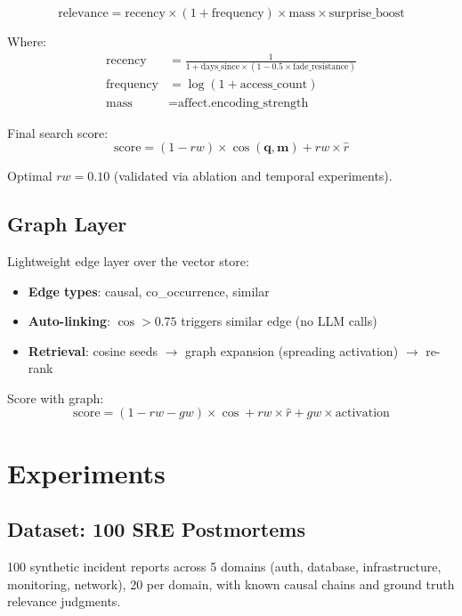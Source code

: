 \documentclass[11pt]{article}
\begin{document}
\begin{equation}
\text{relevance} = \text{recency} \times (1 + \text{frequency}) \times \text{mass} \times \text{surprise\_boost}
\end{equation}

Where:
\begin{align}
\text{recency} &= \frac{1}{1 + \text{days\_since} \times (1 - 0.5 \times \text{fade\_resistance})} \\
\text{frequency} &= \log(1 + \text{access\_count}) \\
\text{mass} &= \text{affect.encoding\_strength}
\end{align}

Final search score:
\begin{equation}
\text{score} = (1 - rw) \times \cos(\mathbf{q}, \mathbf{m}) + rw \times \hat{r}
\end{equation}

Optimal $rw = 0.10$ (validated via ablation and temporal experiments).

\subsection{Graph Layer}

Lightweight edge layer over the vector store:
\begin{itemize}
  \item \textbf{Edge types}: causal, co\_occurrence, similar
  \item \textbf{Auto-linking}: $\cos > 0.75$ triggers similar edge (no LLM calls)
  \item \textbf{Retrieval}: cosine seeds $\rightarrow$ graph expansion (spreading activation) $\rightarrow$ re-rank
\end{itemize}

Score with graph:
\begin{equation}
\text{score} = (1-rw-gw) \times \cos + rw \times \hat{r} + gw \times \text{activation}
\end{equation}

\section{Experiments}

\subsection{Dataset: 100 SRE Postmortems}

100 synthetic incident reports across 5 domains (auth, database,
infrastructure, monitoring, network), 20 per domain, with known causal chains
and ground truth relevance judgments.
\end{document}
